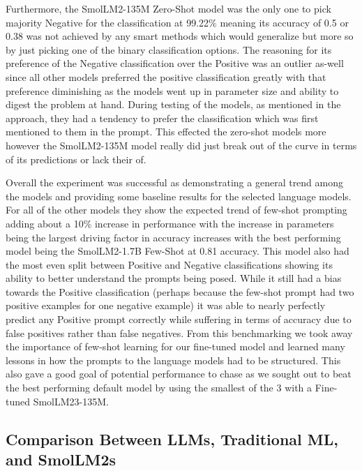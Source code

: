 \documentclass[10pt,twocolumn,letterpaper]{article}
\begin{document}
Furthermore, the SmolLM2-135M Zero-Shot model was the only one to pick majority Negative for the classification at 99.22\% meaning its accuracy of 0.5 or 0.38 was not achieved by any smart methods which would generalize but more so by just picking one of the binary classification options. The reasoning for its preference of the Negative classification over the Positive was an outlier as-well since all other models preferred the positive classification greatly with that preference diminishing as the models went up in parameter size and ability to digest the problem at hand. During testing of the models, as mentioned in the approach, they had a tendency to prefer the classification which was first mentioned to them in the prompt. This effected the zero-shot models more however the SmolLM2-135M model really did just break out of the curve in terms of its predictions or lack their of. 

Overall the experiment was successful as demonstrating a general trend among the models and providing some baseline results for the selected language models. For all of the other models they show the expected trend of few-shot prompting adding about a 10\% increase in performance with the increase in parameters being the largest driving factor in accuracy increases with the best performing model being the SmolLM2-1.7B Few-Shot at 0.81 accuracy. This model also had the most even split between Positive and Negative classifications showing its ability to better understand the prompts being posed. While it still had a bias towards the Positive classification (perhaps because the few-shot prompt had two positive examples for one negative example) it was able to nearly perfectly predict any Positive prompt correctly while suffering in terms of accuracy due to false positives rather than false negatives. From this benchmarking we took away the importance of few-shot learning for our fine-tuned model and learned many lessons in how the prompts to the language models had to be structured. This also gave a good goal of potential performance to chase as we sought out to beat the best performing default model by using the smallest of the 3 with a Fine-tuned SmolLM23-135M. 


\subsection{Comparison Between LLMs, Traditional ML, and SmolLM2s}
\end{document}
